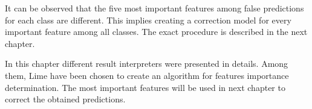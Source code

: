 
It can be observed that the five most important features among false predictions for each class are different. This implies creating a correction model for every important feature among all classes. The exact procedure is described in the next chapter.

In this chapter different result interpreters were presented in details. Among them, Lime have been chosen to create an algorithm for features importance determination. The most important features will be used in next chapter to correct the obtained predictions. 